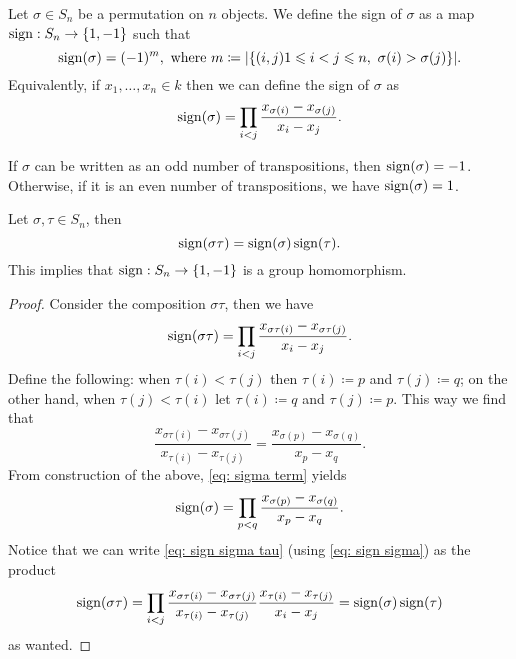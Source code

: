 \begin{definition}[Sign]
    \label{def: sign}
    Let \(\sigma \in S_n\) be a permutation on \(n\) objects. We define
    the sign of \(\sigma\) as a map \(\operatorname{sign}: S_n \to
    \{1, -1\}\) such that
    \[
        \operatorname{sign}(\sigma) = (-1)^m, \text{ where }
        m \coloneq |\{(i, j) \relax 1 \leqslant i < j \leqslant n,\ \sigma(i) > \sigma(j)\}|.
    \]
    Equivalently, if \(x_1, \dots, x_n \in k\) then we can define the
    sign of \(\sigma\) as
    \[
        \operatorname{sign}(\sigma) = \prod_{i < j} \frac{x_{\sigma(i)} -
            x_{\sigma(j)}}{x_i - x_j}.
    \]
\end{definition}

\begin{corollary}
    If \(\sigma\) can be written as an odd number of transpositions, then
    \(\operatorname{sign}(\sigma) = -1\). Otherwise, if it is an even number of
    transpositions, we have \(\operatorname{sign}(\sigma) = 1\).
\end{corollary}

\begin{proposition}\label{prop: sign is a group homomorphism}
    Let \(\sigma, \tau \in S_n\), then
    \[
        \operatorname{sign}(\sigma \tau) = \operatorname{sign}(\sigma)
        \operatorname{sign}(\tau).
    \]
    This implies that \(\operatorname{sign}: S_n \to \{1, -1\}\) is a
    group homomorphism.
\end{proposition}

\begin{proof}
    Consider the composition \(\sigma \tau\), then we have
    \begin{equation}\label{eq: sign sigma tau}
        \operatorname{sign}(\sigma \tau) = \prod_{i < j} \frac{x_{\sigma\tau(i)} -
            x_{\sigma\tau(j)}}{x_i - x_j}.
    \end{equation}
    Define the following: when \(\tau(i) < \tau(j)\) then \(\tau(i) \coloneq p\) and
    \(\tau(j) \coloneq q\); on the other hand, when \(\tau(j) < \tau(i)\) let \(\tau(i)
    \coloneq q\) and \(\tau(j) \coloneq p\). This way we find that
    \begin{equation}\label{eq: sigma term}
        \frac{x_{\sigma\tau(i)} - x_{\sigma\tau(j)}}{x_{\tau(i)} - x_{\tau(j)}}
        = \frac{x_{\sigma(p)} - x_{\sigma(q)}}{x_p - x_q}.
    \end{equation}
    From construction of the above, \cref{eq: sigma term} yields
    \begin{equation}\label{eq: sign sigma}
        \operatorname{sign}(\sigma) = \prod_{p < q} \frac{x_{\sigma(p)} -
            x_{\sigma(q)}}{x_p - x_q}.
    \end{equation}
    Notice that we can write \cref{eq: sign sigma tau} (using \cref{eq: sign
        sigma}) as the product
    \[
        \operatorname{sign}(\sigma \tau) = \prod_{i < j}
        \frac{x_{\sigma \tau(i)} - x_{\sigma \tau(j)}}{x_{\tau(i)} - x_{\tau(j)}}
        \frac{x_{\tau(i)} - x_{\tau(j)}}{x_i - x_j}
        = \operatorname{sign}(\sigma) \operatorname{sign}(\tau)
    \]
    as wanted.
\end{proof}


